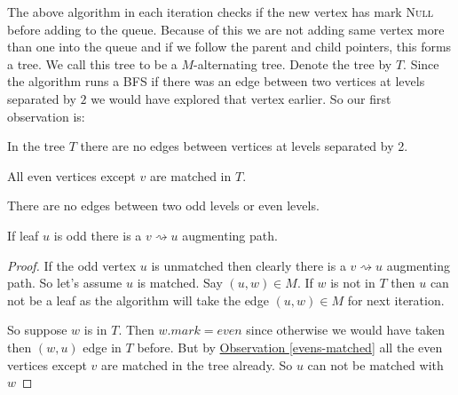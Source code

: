 The above algorithm in each iteration checks if the new vertex has mark \textsc{Null} before adding to the queue. Because of this we are not adding same vertex more than one into the queue and if we follow the parent and child pointers, this forms a tree. We call this tree to be a $M$-alternating tree. Denote the tree by $T$.
Since the algorithm runs a BFS if there was an edge between two vertices at levels separated by $2$ we would have explored that vertex earlier. So our first observation is:
\begin{observation}
	In the tree $T$ there are no edges between vertices at levels separated by 2. 
\end{observation}
\begin{observation}\label{evens-matched}
	All even vertices except $v$ are matched in $T$.
\end{observation}
\begin{observation}
	There are no edges between two odd levels or even levels.
\end{observation}

\begin{lemma}{}{}
	If leaf $u$ is odd there is a $v\rightsquigarrow u$ augmenting path.
\end{lemma}
\begin{proof}
If the odd vertex $u$ is unmatched then clearly there is a $v\rightsquigarrow u$ augmenting path. So let's assume $u$ is matched. Say $(u,w)\in M$. If $w$ is not in $T$ then $u$ can not be a leaf as the algorithm will take the edge $(u,w)\in M$ for next iteration.

So suppose $w$ is in $T$. Then $w.\textit{mark}=\textit{even}$ since otherwise we would have taken then $(w,u)$ edge in $T$ before. But by \hyperref[evens-matched]{Observation \ref{evens-matched}} all the even vertices except $v$ are matched in the tree already. So $u$ can not be matched with $w$
\end{proof}


